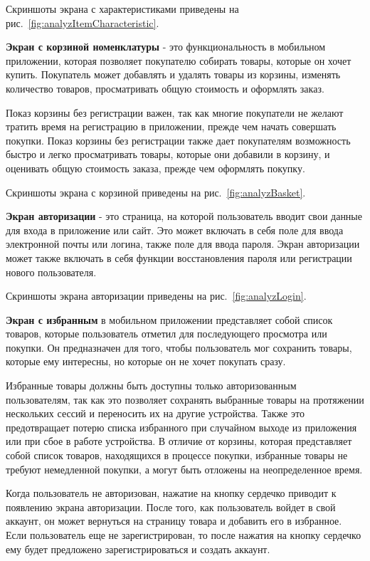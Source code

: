 Скриншоты экрана с характеристиками приведены на рис.~\ref{fig:analyzItemCharacteristic}.

\textbf{Экран с корзиной номенклатуры} - это функциональность в мобильном приложении,
которая позволяет покупателю собирать товары, которые он хочет купить.
Покупатель может добавлять и удалять товары из корзины, изменять количество товаров,
просматривать общую стоимость и оформлять заказ.

Показ корзины без регистрации важен,
так как многие покупатели не желают тратить время на регистрацию в приложении,
прежде чем начать совершать покупки.
Показ корзины без регистрации также дает покупателям возможность быстро и легко просматривать товары,
которые они добавили в корзину, и оценивать общую стоимость заказа, прежде чем оформлять покупку.

Скриншоты экрана с корзиной приведены на рис.~\ref{fig:analyzBasket}.

\textbf{Экран авторизации} - это страница, на которой пользователь вводит свои данные для входа
в приложение или сайт.
Это может включать в себя поле для ввода электронной почты или логина, 
 также поле для ввода пароля.
Экран авторизации может также включать в себя функции восстановления пароля
или регистрации нового пользователя. 

Скриншоты экрана авторизации приведены на рис.~\ref{fig:analyzLogin}.

\textbf{Экран с избранным} в мобильном приложении представляет собой список товаров,
которые пользователь отметил для последующего просмотра или покупки.
Он предназначен для того, чтобы пользователь мог сохранить товары, которые ему интересны,
но которые он не хочет покупать сразу.

Избранные товары должны быть доступны только авторизованным пользователям,
так как это позволяет сохранять выбранные товары на протяжении нескольких сессий
и переносить их на другие устройства.
Также это предотвращает потерю списка избранного при случайном выходе из приложения
или при сбое в работе устройства.
В отличие от корзины, которая представляет собой список товаров, находящихся в процессе покупки,
избранные товары не требуют немедленной покупки,
а могут быть отложены на неопределенное время.

Когда пользователь не авторизован, нажатие на кнопку сердечко приводит к появлению экрана авторизации.
После того, как пользователь войдет в свой аккаунт,
он может вернуться на страницу товара и добавить его в избранное.
Если пользователь еще не зарегистрирован,
то после нажатия на кнопку сердечко ему будет предложено зарегистрироваться и создать аккаунт.

